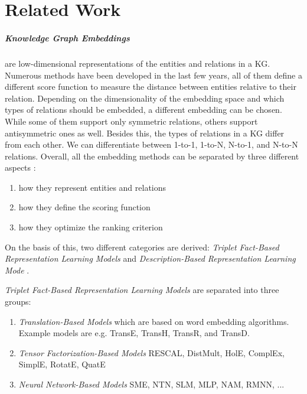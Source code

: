 \chapter{Related Work}
\label{ch:relatedwork}

\paragraph{Knowledge Graph Embeddings} 
are low-dimensional representations of the entities and relations in a \ac{KG}. 
Numerous methods have been developed in the last few years, all of them define a different score function to measure the distance between entities relative to their relation.
Depending on the dimensionality of the embedding space and which types of relations should be embedded, a different embedding can be chosen.
While some of them support only symmetric relations, others support antisymmetric ones as well. 
Besides this, the types of relations in a \ac{KG} differ from each other.
We can differentiate between 1-to-1, 1-to-N, N-to-1, and N-to-N relations.
Overall, all the embedding methods can be separated by three different aspects \cite{electronics9050750}:
\begin{enumerate}
    \item how they represent entities and relations
    \item how they define the scoring function
    \item how they optimize the ranking criterion
\end{enumerate}
On the basis of this, two different categories are derived:
\textit{Triplet Fact-Based Representation Learning Models} and \textit{Description-Based Representation Learning Mode} \cite{electronics9050750}.

\textit{Triplet Fact-Based Representation Learning Models} are separated into three groups:
\begin{enumerate}
    \item 
    \textit{Translation-Based Models}  which are based on word embedding algorithms. 
    Example models are e.g. TransE, TransH, TransR, and TransD.
    
    \item 
    \textit{Tensor Factorization-Based Models}
    RESCAL, DistMult, HolE, ComplEx, SimplE, RotatE,  QuatE  
    
    \item 
    \textit{Neural Network-Based Models}
    SME, NTN, SLM, MLP, NAM, RMNN, ...
\end{enumerate}


